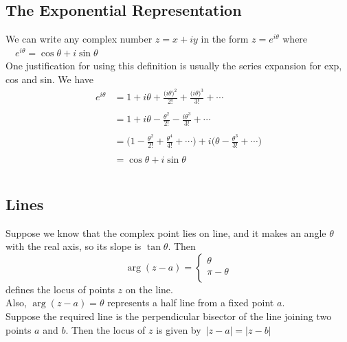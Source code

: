 \documentclass[11pt,a4paper]{article}
\theoremstyle{definition}
\begin{document}
{\color[wave]{485}\subsection{The Exponential Representation}}
We can write any complex number $z = x + iy$ in the form $\displaystyle{z = e^{i\theta}}$ where $\quad \displaystyle{e^{i\theta} = \cos \theta + i \sin \theta}$\\

One justification for using this definition is usually the series expansion for exp, cos and sin. We have 
\begin{align*}
e^{i\theta} & = 1 + i\theta + \frac{\big(i\theta\big)^2}{2!} + \frac{\big(i\theta\big)^3}{3!}+ \cdots\\\\
& = 1 + i\theta  - \frac{\theta^2}{2!} - \frac{i \theta^3}{3!} + \cdots\\\\
& = \Bigg(1 - \frac{\theta^2}{2!} + \frac{\theta^4}{4!} + \cdots\Bigg) + i \Bigg( \theta - \frac{\theta^3}{3!}+ \cdots\Bigg)\\\\
& = \cos \theta + i \sin \theta\\\\
\end{align*}









{\color[wave]{485}\subsection{Lines}}
Suppose we know that the complex point lies on line, and it makes an angle $\theta$ with the real axis, so its slope is $\tan \theta$. Then 
$$\operatorname{arg}(z - a) = \begin{cases}
\theta\\
\pi - \theta\\
\end{cases}$$
defines the locus of points $z$ on the line.\\

Also, $\operatorname{arg}(z - a) = \theta$ represents a half line from a fixed point $a$.\\

Suppose the required line is the perpendicular bisector of the line joining two points $a$ and $b$. Then the locus of $z$ is given by $\, \left|z - a\right| = \left|z - b\right|$\\\\
\end{document}
